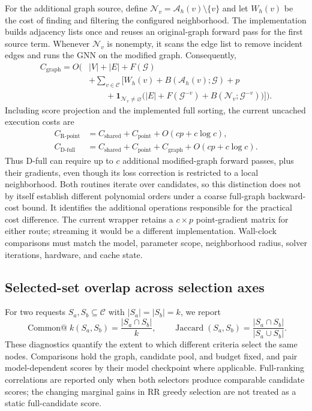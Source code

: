For the additional graph source, define $\mathcal N_v=\mathcal A_h(v)\setminus\{v\}$ and let $W_h(v)$ be the cost of finding and filtering the configured neighborhood. The implementation builds adjacency lists once and reuses an original-graph forward pass for the first source term. Whenever $\mathcal N_v$ is nonempty, it scans the edge list to remove incident edges and runs the GNN on the modified graph. Consequently,
\begin{equation}
\begin{aligned}
C_{\mathrm{graph}}=O\Bigg(&|V|+|E|+F(\mathcal G)\\
&+\sum_{v\in\mathcal C}\Big[
W_h(v)+B(\mathcal A_h(v);\mathcal G)+p\\
&\qquad+\mathbf1_{\mathcal N_v\ne\varnothing}
\big(|E|+F(\mathcal G^{-v})+B(\mathcal N_v;\mathcal G^{-v})\big)
\Big]\Bigg).
\end{aligned}
\end{equation}
Including score projection and the implemented full sorting, the current uncached execution costs are
\begin{equation}
\begin{aligned}
C_{\mathrm{R\text{-}point}}&=C_{\mathrm{shared}}+C_{\mathrm{point}}
+O(cp+c\log c),\\
C_{\mathrm{D\text{-}full}}&=C_{\mathrm{shared}}+C_{\mathrm{point}}
+C_{\mathrm{graph}}+O(cp+c\log c).
\end{aligned}
\end{equation}
Thus D-full can require up to $c$ additional modified-graph forward passes, plus their gradients, even though its loss correction is restricted to a local neighborhood. Both routines iterate over candidates, so this distinction does not by itself establish different polynomial orders under a coarse full-graph backward-cost bound. It identifies the additional operations responsible for the practical cost difference. The current wrapper retains a $c\times p$ point-gradient matrix for either route; streaming it would be a different implementation. Wall-clock comparisons must match the model, parameter scope, neighborhood radius, solver iterations, hardware, and cache state.

\subsection{Selected-set overlap across selection axes}
\label{app:selection-overlap}

For two requests $S_a,S_b\subseteq\mathcal C$ with $|S_a|=|S_b|=k$, we report
\begin{equation}
\operatorname{Common@}k(S_a,S_b)=\frac{|S_a\cap S_b|}{k},
\qquad
\operatorname{Jaccard}(S_a,S_b)=
\frac{|S_a\cap S_b|}{|S_a\cup S_b|}.
\label{eq:selection-overlap}
\end{equation}
These diagnostics quantify the extent to which different criteria select the same nodes. Comparisons hold the graph, candidate pool, and budget fixed, and pair model-dependent scores by their model checkpoint where applicable. Full-ranking correlations are reported only when both selectors produce comparable candidate scores; the changing marginal gains in RR greedy selection are not treated as a static full-candidate score.

